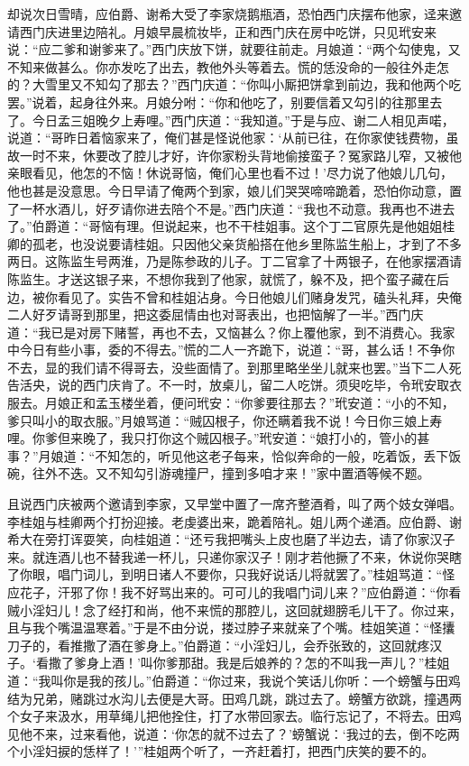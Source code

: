 却说次日雪晴，应伯爵、谢希大受了李家烧鹅瓶酒，恐怕西门庆摆布他家，迳来邀请西门庆进里边陪礼。月娘早晨梳妆毕，正和西门庆在房中吃饼，只见玳安来说：“应二爹和谢爹来了。”西门庆放下饼，就要往前走。月娘道：“两个勾使鬼，又不知来做甚么。你亦发吃了出去，教他外头等着去。慌的恁没命的一般往外走怎的？大雪里又不知勾了那去？”西门庆道：“你叫小厮把饼拿到前边，我和他两个吃罢。”说着，起身往外来。月娘分咐：“你和他吃了，别要信着又勾引的往那里去了。今日孟三姐晚夕上寿哩。”西门庆道：“我知道。”于是与应、谢二人相见声喏，说道：“哥昨日着恼家来了，俺们甚是怪说他家：‘从前已往，在你家使钱费物，虽故一时不来，休要改了腔儿才好，许你家粉头背地偷接蛮子？冤家路儿窄，又被他亲眼看见，他怎的不恼！休说哥恼，俺们心里也看不过！’尽力说了他娘儿几句，他也甚是没意思。今日早请了俺两个到家，娘儿们哭哭啼啼跪着，恐怕你动意，置了一杯水酒儿，好歹请你进去陪个不是。”西门庆道：“我也不动意。我再也不进去了。”伯爵道：“哥恼有理。但说起来，也不干桂姐事。这个丁二官原先是他姐姐桂卿的孤老，也没说要请桂姐。只因他父亲货船搭在他乡里陈监生船上，才到了不多两日。这陈监生号两淮，乃是陈参政的儿子。丁二官拿了十两银子，在他家摆酒请陈监生。才送这银子来，不想你我到了他家，就慌了，躲不及，把个蛮子藏在后边，被你看见了。实告不曾和桂姐沾身。今日他娘儿们赌身发咒，磕头礼拜，央俺二人好歹请哥到那里，把这委屈情由也对哥表出，也把恼解了一半。”西门庆道：“我已是对房下赌誓，再也不去，又恼甚么？你上覆他家，到不消费心。我家中今日有些小事，委的不得去。”慌的二人一齐跪下，说道：“哥，甚么话！不争你不去，显的我们请不得哥去，没些面情了。到那里略坐坐儿就来也罢。”当下二人死告活央，说的西门庆肯了。不一时，放桌儿，留二人吃饼。须臾吃毕，令玳安取衣服去。月娘正和孟玉楼坐着，便问玳安：“你爹要往那去？”玳安道：“小的不知，爹只叫小的取衣服。”月娘骂道：“贼囚根子，你还瞒着我不说！今日你三娘上寿哩。你爹但来晚了，我只打你这个贼囚根子。”玳安道：“娘打小的，管小的甚事？”月娘道：“不知怎的，听见他这老子每来，恰似奔命的一般，吃着饭，丢下饭碗，往外不迭。又不知勾引游魂撞尸，撞到多咱才来！”家中置酒等候不题。

且说西门庆被两个邀请到李家，又早堂中置了一席齐整酒肴，叫了两个妓女弹唱。李桂姐与桂卿两个打扮迎接。老虔婆出来，跪着陪礼。姐儿两个递酒。应伯爵、谢希大在旁打诨耍笑，向桂姐道：“还亏我把嘴头上皮也磨了半边去，请了你家汉子来。就连酒儿也不替我递一杯儿，只递你家汉子！刚才若他撅了不来，休说你哭瞎了你眼，唱门词儿，到明日诸人不要你，只我好说话儿将就罢了。”桂姐骂道：“怪应花子，汗邪了你！我不好骂出来的。可可儿的我唱门词儿来？”应伯爵道：“你看贼小淫妇儿！念了经打和尚，他不来慌的那腔儿，这回就翅膀毛儿干了。你过来，且与我个嘴温温寒着。”于是不由分说，搂过脖子来就亲了个嘴。桂姐笑道：“怪攮刀子的，看推撒了酒在爹身上。”伯爵道：“小淫妇儿，会乔张致的，这回就疼汉子。‘看撒了爹身上酒！’叫你爹那甜。我是后娘养的？怎的不叫我一声儿？”桂姐道：“我叫你是我的孩儿。”伯爵道：“你过来，我说个笑话儿你听：一个螃蟹与田鸡结为兄弟，赌跳过水沟儿去便是大哥。田鸡几跳，跳过去了。螃蟹方欲跳，撞遇两个女子来汲水，用草绳儿把他拴住，打了水带回家去。临行忘记了，不将去。田鸡见他不来，过来看他，说道：‘你怎的就不过去了？’螃蟹说：‘我过的去，倒不吃两个小淫妇捩的恁样了！’”桂姐两个听了，一齐赶着打，把西门庆笑的要不的。


